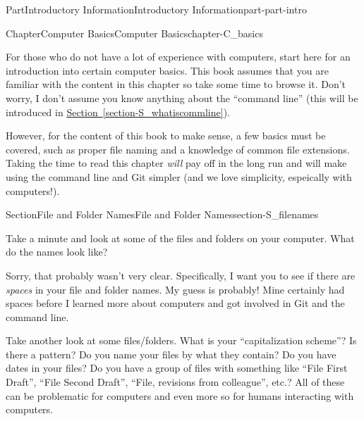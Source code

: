 \documentclass[oneside,10pt,]{book}
\newcommand{\xreffont}{\relax}
\begin{document}
\begin{partptx}{Part}{Introductory Information}{}{Introductory Information}{}{}{part-part-intro}
\renewcommand*{\partname}{Part}
%
\typeout{************************************************}
\typeout{************************************************}
%
\begin{chapterptx}{Chapter}{Computer Basics}{}{Computer Basics}{}{}{chapter-C_basics}
\renewcommand*{\chaptername}{Chapter}
\begin{introduction}{}%
For those who do not have a lot of experience with computers, start here for an introduction into certain computer basics. This book assumes that you are familiar with the content in this chapter so take some time to browse it. Don't worry, I don't assume you know anything about the ``command line'' (this will be introduced in \hyperref[section-S_whatiscommline]{Section~{\xreffont\ref{section-S_whatiscommline}}}).%
\par
However, for the content of this book to make sense, a few basics must be covered, such as proper file naming and a knowledge of common file extensions. Taking the time to read this chapter \emph{will} pay off in the long run and will make using the command line and Git simpler (and we love simplicity, espeically with computers!).%
\end{introduction}%
%
%
\typeout{************************************************}
\typeout{************************************************}
%
\begin{sectionptx}{Section}{File and Folder Names}{}{File and Folder Names}{}{}{section-S_filenames}
%
%
\begin{introduction}{}%
Take a minute and look at some of the files and folders on your computer. What do the names look like?%
\par
Sorry, that probably wasn't very clear. Specifically, I want you to see if there are \emph{spaces} in your file and folder names. My guess is probably! Mine certainly had spaces before I learned more about computers and got involved in Git and the command line.%
\par
Take another look at some files\slash{}folders. What is your ``capitalization scheme''? Is there a pattern? Do you name your files by what they contain? Do you have dates in your files? Do you have a group of files with something like ``File First Draft'', ``File Second Draft'', ``File, revisions from colleague'', etc.? All of these can be problematic for computers and even more so for humans interacting with computers.%

\end{introduction}
\end{sectionptx}
\end{chapterptx}
\end{partptx}
\end{document}
